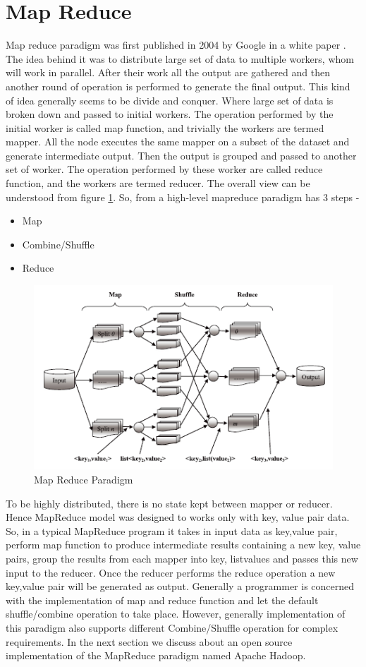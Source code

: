 \documentclass{article}
\begin{document}
\section{Map Reduce}
Map reduce paradigm was first published in 2004 by Google in a white paper \cite{mrgoogle}. The idea behind it was to distribute large set of data to multiple workers, whom will work in parallel. After their work all the output are gathered and then another round of operation is performed to generate the final output. This kind of idea generally seems to be divide and conquer. Where large set of data is broken down and passed to initial workers. The operation performed by the initial worker is called map function, and trivially the workers are termed mapper. All the node executes the same mapper on a subset of the dataset and generate intermediate output. Then the output is grouped and passed to another set of worker. The operation performed by these worker are called reduce function, and the workers are termed reducer. The overall view can be understood from figure \ref{fig:mrp}. So, from a high-level mapreduce paradigm has 3 steps -
\begin{itemize}
\item Map
\item Combine/Shuffle
\item Reduce
\end{itemize}
\begin{figure}[h]
	\centering
	\includegraphics[width=\textwidth]{mr-hadoop-overview}
	\caption{Map Reduce Paradigm}
	\label{fig:mrp}
\end{figure}
To be highly distributed, there is no state kept between mapper or reducer. Hence MapReduce model was designed to works only with {key, value} pair data. So, in a typical MapReduce program it takes in input data as {key,value} pair, perform map function to produce intermediate results containing a new {key, value} pairs, group the results from each mapper into {key, list{values}} and passes this new input to the reducer. Once the reducer performs the reduce operation a new {key,value} pair will be generated as output. Generally a programmer is concerned with the implementation of map and reduce function and let the default shuffle/combine operation to take place. However, generally implementation of this paradigm also supports different Combine/Shuffle operation for complex requirements.
In the next section we discuss about an open source implementation of the MapReduce paradigm named Apache Hadoop.
\end{document}
